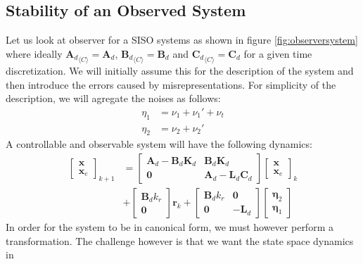 \documentclass[sigconf]{llncs}
\newcommand{\mat}[1]{\boldsymbol{#1}}
\renewcommand{\vec}[1]{\boldsymbol{#1}}
\begin{document}
\subsection{Stability of an Observed System}\label{sec:cof_stability}
Let us look at observer for a SISO systems as shown in figure \ref{fig:observersystem} where ideally ${\mat{A}_d}_{\langle C \rangle}=\mat{A}_d$, ${\mat{B}_d}_{\langle C \rangle}=\mat{B}_d$ and ${\mat{C}_d}_{\langle C \rangle}=\mat{C}_d$ for a given time discretization. We will initially assume this for the description of the system and then introduce the errors caused  by misrepresentations. For simplicity of the description, we will agregate the noises as follows:
\begin{align*}
\eta_1&=\nu_1+\nu_1'+\nu_t\\
\eta_2&=\nu_2+\nu_2'
\end{align*}
A controllable and observable system will have the following dynamics:
\begin{align}
\left [\begin{array}{c}\vec{x}\\ \vec{x}_e \end{array}\right]_{k+1}
&=\left [\begin{array}{cc}\mat{A}_d-\mat{B}_d\mat{K}_d&\mat{B}_d\mat{K}_d\\ \mat{0}&\mat{A}_d-\mat{L}_d\mat{C}_d\end{array}\right]
\left [\begin{array}{c}\vec{x}\\ \vec{x}_e \end{array}\right]_k\nonumber\\
&+\left [\begin{array}{c}\mat{B}_dk_r\\ \mat{0} \end{array}\right] \vec{r}_k
+\left [\begin{array}{cc}\mat{B}_dk_r&\mat{0}\\ \mat{0}&-\mat{L}_d\end{array}\right]\left [\begin{array}{c}\vec{\eta}_2\\ \vec{\eta}_1\end{array}\right]
\label{eq:observer_LTI}
\end{align}
In order for the system to be in canonical form, we must however perform a transformation. The challenge however is that we want the state space dynamics in
\end{document}
